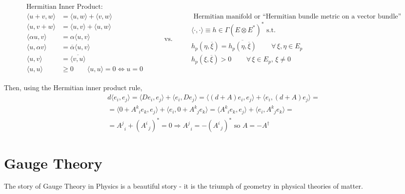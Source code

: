 \documentclass[10pt]{amsart}
\begin{document}
\begin{multicols*}{2}
\[
\begin{gathered}
\text{ Hermitian Inner Product: } \\
\begin{aligned}
  \langle u+v , w \rangle & = \langle u,w \rangle + \langle v,w \rangle \\ 
  \langle u , v+w \rangle & = \langle u,v \rangle + \langle u,w \rangle \\ 
  \langle \alpha u , v \rangle & = \alpha \langle u,v \rangle   \\ 
  \langle u , \alpha v \rangle & = \overline{\alpha} \langle u,v \rangle \\
  \langle u ,  v \rangle & = \overline{  \langle v,u \rangle } \\
\langle u, u \rangle & \geq 0 \qquad \langle u,u \rangle =0 \iff u =0 
\end{aligned} \end{gathered} \qquad \text{ vs. } \qquad  \begin{gathered}
  \text{ Hermitian manifold or ``Hermitian bundle metric on a vector bundle'' } \\ 
  \langle \cdot , \cdot \rangle \equiv h \in \Gamma(E\otimes E^*)^* \text{ s.t. } \\ 
  h_p( \eta, \overline{\xi} )  = \overline{h_p(\eta, \overline{\xi} )} \qquad \, \forall \, \xi, \eta \in E_p \\ 
  h_p(\xi, \overline{\xi} ) > 0 \qquad \, \forall \, \xi \in E_p, \, \xi \neq 0 
\end{gathered}
\] 

Then, using the Hermitian inner product rule,
\[
\begin{gathered}
  d\langle e_i, e_j\rangle = \langle De_i , e_j \rangle + \langle e_i , De_j \rangle = \langle (d+A)e_i, e_j\rangle + \langle e_i, (d+A)e_j \rangle = \\
  = \langle 0 + A^k_{ \; \; i} e_k, e_j \rangle + \langle e_i, 0 + A^k_{ \; \; j} e_k \rangle = \langle A^k_{ \; \; i} e_k , e_j \rangle + \langle e_i , A^k_{ \; \; j} e_k \rangle = \\
    = A^j_{ \; \; i} + (A^i_{ \; \; j} )^* = 0 \Longrightarrow A^j_{ \; \; i} = - (A^i_{ \; \; j})^* \text{ so } A= -A^{\dag}
\end{gathered}
\]

\part{Gauge Theory}

The story of Gauge Theory in Physics is a beautiful story - it is the triumph of geometry in physical theories of matter.  


\end{multicols*}
\end{document}
